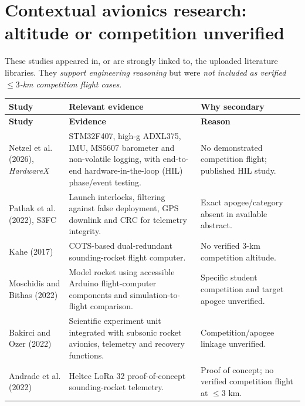 \documentclass[10pt,a4paper]{article}
\begin{document}
\section{Contextual avionics research: altitude or competition unverified}
These studies appeared in, or are strongly linked to, the uploaded literature libraries. They \emph{support engineering reasoning} but were \emph{not included as verified $\leq3$-km competition flight cases}.
\small
\begin{longtable}{@{}L{45mm}L{69mm}L{28mm}@{}}
\toprule{}\textbf{Study} & \textbf{Relevant evidence} & \textbf{Why secondary}\\\midrule\endfirsthead
\toprule{}\textbf{Study} & \textbf{Evidence} & \textbf{Reason}\\\midrule\endhead
\bottomrule\endlastfoot
Netzel et al. (2026), \emph{HardwareX} \cite{netzel2026} & STM32F407, high-g ADXL375, IMU, MS5607 barometer and non-volatile logging, with end-to-end hardware-in-the-loop (HIL) phase/event testing. & No demonstrated competition flight; published HIL study.\\
Pathak et al. (2022), S3FC \cite{pathak2022} & Launch interlocks, filtering against false deployment, GPS downlink and CRC for telemetry integrity. & Exact apogee/category absent in available abstract.\\
Kahe (2017) \cite{kahe2017} & COTS-based dual-redundant sounding-rocket flight computer. & No verified 3-km competition altitude.\\
Moschidis and Bithas (2022) \cite{moschidis2022} & Model rocket using accessible Arduino flight-computer components and simulation-to-flight comparison. & Specific student competition and target apogee unverified.\\
Bakirci and Ozer (2022) \cite{bakirci2022} & Scientific experiment unit integrated with subsonic rocket avionics, telemetry and recovery functions. & Competition/apogee linkage unverified.\\
Andrade et al. (2022) \cite{andrade2022} & Heltec LoRa 32 proof-of-concept sounding-rocket telemetry. & Proof of concept; no verified competition flight at $\leq3$ km.\\
\end{longtable}
\normalsize
\end{document}
